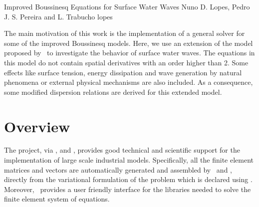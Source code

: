  {Improved Boussinesq Equations for Surface
  Water Waves} {Nuno D. Lopes, Pedro J. S. Pereira and
  L. Trabucho} {lopes}



The main motivation of this work is the implementation of a
general solver for some of the improved Boussinesq
models.  Here, we use an extension
of the model proposed by~\cite{ZhaoTengCheng2004} to
investigate the behavior of surface water waves. The
equations in this model do not contain spatial derivatives
with an order higher than 2. Some effects like surface
tension, energy dissipation and wave generation by natural
phenomena or external physical mechanisms are also included.
As a consequence, some modified dispersion relations are
derived for this extended model.

\section{Overview}
The \fenics project, via \dolfin, \ufl and \ffc, provides
good technical and scientific support for the implementation
of large scale industrial models. Specifically, all the
finite element matrices and vectors are automatically
generated and assembled by \dolfin\ and \ffc, directly from
the variational formulation of the problem which is declared
using \ufl. Moreover, \dolfin\ provides a user friendly
interface for the libraries needed to solve the finite
element system of equations.

